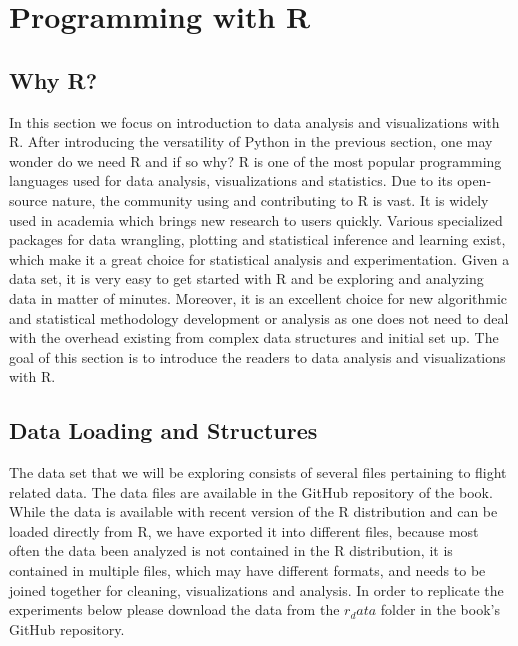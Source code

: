 \section{Programming with R}

\subsection{Why R?}

In this section we focus on introduction to data analysis and visualizations with R. After introducing the versatility of Python in the previous section, one may wonder do we need R and if so why? R is one of the most popular programming languages used for data analysis, visualizations and statistics. Due to its open-source nature, the community using and contributing to R is vast. It is widely used in academia which brings new research to users quickly. Various specialized packages for data wrangling, plotting and statistical inference and learning exist, which make it a great choice for statistical analysis and experimentation. Given a data set, it is very easy to get started with R and be exploring and analyzing data in matter of minutes. Moreover, it is an excellent choice for new algorithmic and statistical methodology development or analysis as one does not need to deal with the overhead existing from complex data structures and initial set up. The goal of this section is to introduce the readers to data analysis and visualizations with R.

\subsection{Data Loading and Structures}
The data set that we will be exploring consists of several files pertaining to flight related data. The data files are available in the GitHub repository of the book. While the data is available with recent version of the R distribution and can be loaded directly from R, we have exported it into different files, because most often the data been analyzed is not contained in the R distribution, it is contained in multiple files, which may have different formats, and needs to be joined together for cleaning, visualizations and analysis. In order to replicate the experiments below please download the data from the $r_data$ folder in the book's GitHub repository.

